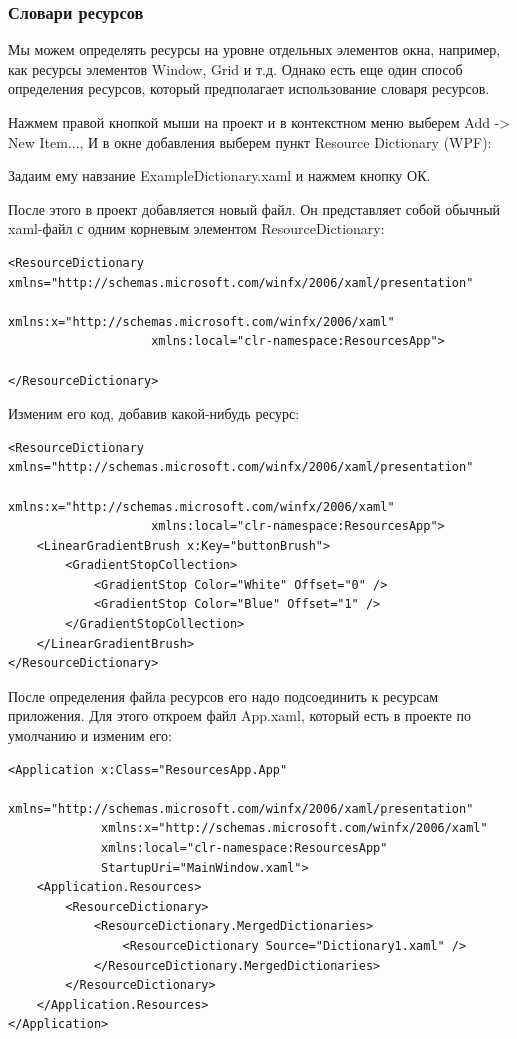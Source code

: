 \subsubsection{Словари ресурсов}

Мы можем определять ресурсы на уровне отдельных элементов окна, например, как ресурсы элементов Window, Grid и т.д. Однако есть еще один способ определения ресурсов, который предполагает использование словаря ресурсов.

Нажмем правой кнопкой мыши на проект и в контекстном меню выберем Add -> New Item..., И в окне добавления выберем пункт Resource Dictionary (WPF):

Задаим ему навзание ExampleDictionary.xaml и нажмем кнопку ОК.

После этого в проект добавляется новый файл. Он представляет собой обычный xaml-файл с одним корневым элементом ResourceDictionary:

\begin{verbatim}
<ResourceDictionary xmlns="http://schemas.microsoft.com/winfx/2006/xaml/presentation"
                    xmlns:x="http://schemas.microsoft.com/winfx/2006/xaml"
                    xmlns:local="clr-namespace:ResourcesApp">
     
</ResourceDictionary>
\end{verbatim}

Изменим его код, добавив какой-нибудь ресурс:

\begin{verbatim}
<ResourceDictionary xmlns="http://schemas.microsoft.com/winfx/2006/xaml/presentation"
                    xmlns:x="http://schemas.microsoft.com/winfx/2006/xaml"
                    xmlns:local="clr-namespace:ResourcesApp">
    <LinearGradientBrush x:Key="buttonBrush">
        <GradientStopCollection>
            <GradientStop Color="White" Offset="0" />
            <GradientStop Color="Blue" Offset="1" />
        </GradientStopCollection>
    </LinearGradientBrush>
</ResourceDictionary>
\end{verbatim}

После определения файла ресурсов его надо подсоединить к ресурсам приложения. Для этого откроем файл App.xaml, который есть в проекте по умолчанию и изменим его:

\begin{verbatim}
<Application x:Class="ResourcesApp.App"
             xmlns="http://schemas.microsoft.com/winfx/2006/xaml/presentation"
             xmlns:x="http://schemas.microsoft.com/winfx/2006/xaml"
             xmlns:local="clr-namespace:ResourcesApp"
             StartupUri="MainWindow.xaml">
    <Application.Resources>
        <ResourceDictionary>
            <ResourceDictionary.MergedDictionaries>
                <ResourceDictionary Source="Dictionary1.xaml" />
            </ResourceDictionary.MergedDictionaries>
        </ResourceDictionary>
    </Application.Resources>
</Application>
\end{verbatim}

